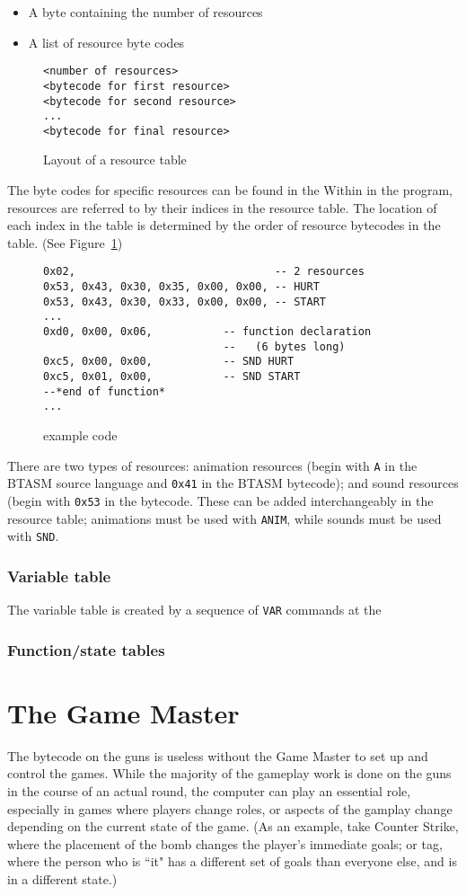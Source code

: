 \documentclass[12pt,a4paper]{scrbook}
\begin{document}
\begin{itemize}
\item A byte containing the number of resources
\item A list of resource byte codes
\end{itemize}
\begin{figure}[h]
\begin{lstlisting}
<number of resources>
<bytecode for first resource>
<bytecode for second resource>
...
<bytecode for final resource>
\end{lstlisting}
\caption{Layout of a resource table} 
\end{figure}

The byte codes for specific resources can be found in the 
Within in the program, resources are referred to by their indices in the resource table.  The
location of each index in the table is determined by the order of resource bytecodes in the
table.  (See Figure~\ref{Resource table})
\begin{figure}[h]
\begin{lstlisting}
0x02,								-- 2 resources
0x53, 0x43, 0x30, 0x35, 0x00, 0x00, -- HURT
0x53, 0x43, 0x30, 0x33, 0x00, 0x00,	-- START
...
0xd0, 0x00, 0x06, 			-- function declaration 
							--   (6 bytes long)
0xc5, 0x00, 0x00,			-- SND HURT
0xc5, 0x01, 0x00,			-- SND START
--*end of function*
...
\end{lstlisting}
\caption{\label{Resource table} example code} 
\end{figure}

There are two types of resources: animation resources (begin with \texttt{A} in the BTASM source
language and \texttt{0x41} in the BTASM bytecode); and sound resources (begin with \texttt{0x53}
in the bytecode.  These can be added interchangeably in the resource table; animations must be
used with \texttt{ANIM}, while sounds must be used with \texttt{SND}.


\subsection{Variable table}
\label{sec:vartable}
The variable table is created by a sequence of \texttt{VAR} commands at the 

\subsection{Function/state tables}
\label{sec:funstatetables}

\chapter{The Game Master}
The bytecode on the guns is useless without the Game Master to set up and control the games.  While
the majority of the gameplay work is done on the guns in the course of an actual round, the computer
can play an essential role, especially in games where players change roles, or aspects of the 
gamplay change depending on the current state of the game.  (As an example, take Counter Strike, 
where the placement of the bomb changes the player's immediate goals; or tag, where the person who
is ``it" has a different set of goals than everyone else, and is in a different state.)
\end{document}

